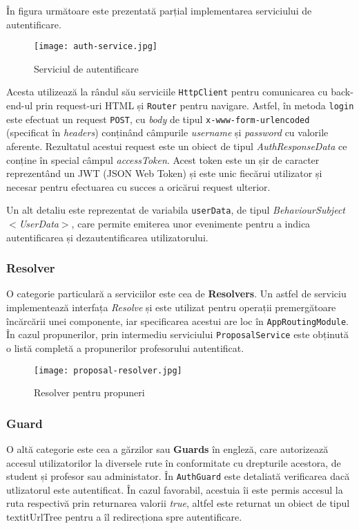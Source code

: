 În figura următoare este prezentată parțial implementarea serviciului de autentificare.

\begin{figure}[H]
	\centering
	\texttt{[image: auth-service.jpg]}
	\caption{Serviciul de autentificare}
\end{figure}

Acesta utilizează la rândul său serviciile \texttt{HttpClient} pentru comunicarea cu back-end-ul prin request-uri HTML și \texttt{Router} pentru navigare. Astfel, în metoda \texttt{login} este efectuat un request \texttt{POST}, cu \textit{body} de tipul \texttt{x-www-form-urlencoded} (specificat în \textit{headers}) conținând câmpurile \textit{username} și \textit{password} cu valorile aferente. Rezultatul acestui request este un obiect de tipul \textit{AuthResponseData} ce conține în special câmpul \textit{accessToken}. Acest token este un șir de caracter reprezentând un JWT (JSON Web Token) și este unic fiecărui utilizator și necesar pentru efectuarea cu succes a oricărui request ulterior.

Un alt detaliu este reprezentat de variabila \texttt{userData}, de tipul \textit{BehaviourSubject$<$UserData$>$}, care permite emiterea unor evenimente pentru a indica autentificarea și dezautentificarea utilizatorului.

\subsubsection{Resolver}
O categorie particulară a serviciilor este cea de \textbf{Resolvers}. Un astfel de serviciu implementează interfața \textit{Resolve} și este utilizat pentru operații premergătoare încărcării unei componente, iar specificarea acestui are loc în \texttt{AppRoutingModule}. În cazul propunerilor, prin intermediu serviciului \texttt{ProposalService} este obținută o listă completă a propunerilor profesorului autentificat.

\begin{figure}[H]
	\centering
	\texttt{[image: proposal-resolver.jpg]}
	\caption{Resolver pentru propuneri}
\end{figure}

\subsubsection{Guard}

O altă categorie este cea a gărzilor sau \textbf{Guards} în engleză, care autorizează accesul utilizatorilor la diversele rute în conformitate cu drepturile acestora, de student și profesor sau administator. În \texttt{AuthGuard} este detaliată verificarea dacă utlizatorul este autentificat. În cazul favorabil, acestuia îi este permis accesul la ruta respectivă prin returnarea valorii \textit{true}, altfel este returnat un obiect de tipul textit{UrlTree} pentru a îl redirecționa spre autentificare.


